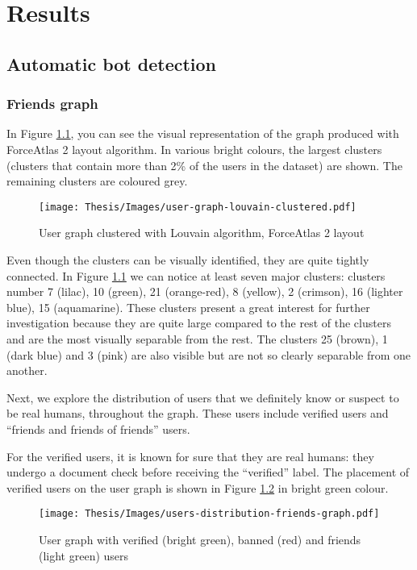 \chapter{Results}
\label{ch:results}

\section{Automatic bot detection}

\subsection{Friends graph}
In Figure \ref{fig:user-graph-louvain}, you can see the visual representation of the graph produced with ForceAtlas 2 layout algorithm. In various bright colours, the largest clusters (clusters that contain more than 2\% of the users in the dataset) are shown. The remaining clusters are coloured grey.

\begin{figure}
	\centering
	\texttt{[image: Thesis/Images/user-graph-louvain-clustered.pdf]}
	\caption{User graph clustered with Louvain algorithm, ForceAtlas 2 layout}
	\label{fig:user-graph-louvain}
\end{figure}

Even though the clusters can be visually identified, they are quite tightly
connected. In Figure \ref{fig:user-graph-louvain} we can notice at least seven major clusters: clusters number 7 (lilac), 10 (green), 21 (orange-red), 8 (yellow), 2 (crimson), 16 (lighter blue), 15 (aquamarine). These clusters present a great interest for further investigation because they are quite large compared to the rest of the clusters and are the most visually separable from the rest. The clusters 25 (brown), 1 (dark blue) and 3 (pink) are also visible but are not so clearly separable from one another.

Next, we explore the distribution of users that we definitely know or suspect to be real humans, throughout the graph. These users include verified users and ``friends and friends of friends'' users.

For the verified users, it is known for sure that they are real humans: they undergo a document check before receiving the ``verified'' label. The placement of verified users on the user graph is shown in Figure \ref{fig:users-distribution-friends-graph} in bright green colour.

\begin{figure}
	\centering
	\texttt{[image: Thesis/Images/users-distribution-friends-graph.pdf]}
	\caption{User graph with verified (bright green), banned (red) and friends (light green) users}
	\label{fig:users-distribution-friends-graph}
\end{figure}

